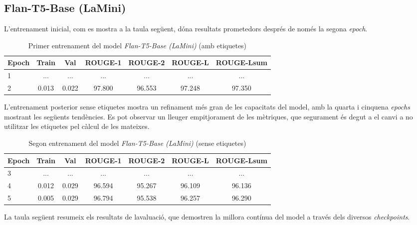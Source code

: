 \subsection{Flan-T5-Base (LaMini)}
L'entrenament inicial, com es mostra a la taula següent, dóna resultats prometedors després de només la segona \textit{epoch}.
\begin{table}[H]
    \centering
    \begin{tabular}{lcccccc}
    \toprule
    Epoch & Train & Val & ROUGE-1 & ROUGE-2 & ROUGE-L & ROUGE-Lsum \\
    \midrule
    1 & ...   & ...   & ...    & ...    & ...    & ... \\
    2 & 0.013 & 0.022 & 97.800 & 96.553 & 97.248 & 97.350 \\
    \bottomrule
    \end{tabular}
    \caption[Primer entrenament del model \textit{Flan-T5-Base (LaMini)}]{Primer entrenament del model \textit{Flan-T5-Base (LaMini)} (amb etiquetes)}
\end{table}

L'entrenament posterior sense etiquetes mostra un refinament més gran de les capacitats del model, amb la quarta i cinquena \textit{epochs} mostrant les següents tendències. Es pot observar un lleuger empitjorament de les mètriques, que segurament és degut a el canvi a no utilitzar les etiquetes pel càlcul de les mateixes.

\begin{table}[H]
    \centering
    \begin{tabular}{lcccccc}
    \toprule
    Epoch & Train & Val & ROUGE-1 & ROUGE-2 & ROUGE-L & ROUGE-Lsum \\
    \midrule
    3 & ...  & ...    & ...    & ...    & ...    & ... \\
    4 & 0.012 & 0.029 & 96.594 & 95.267 & 96.109 & 96.136 \\
    5 & 0.005 & 0.029 & 96.794 & 95.538 & 96.257 & 96.290 \\
    \bottomrule
    \end{tabular}
    \caption[Segon entrenament del model \textit{Flan-T5-Base (LaMini)}]{Segon entrenament del model \textit{Flan-T5-Base (LaMini)} (sense etiquetes)}
\end{table}

La taula següent resumeix els resultats de lavaluació, que demostren la millora contínua del model a través dels diversos \textit{checkpoints}.

